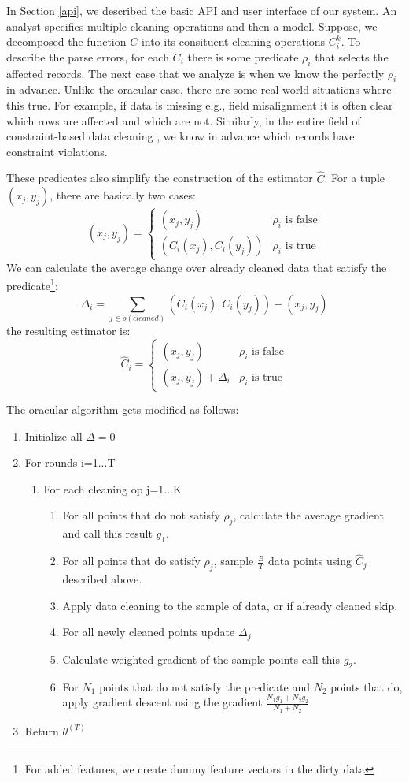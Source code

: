In Section \ref{api}, we described the basic API and user interface of our system.
An analyst specifies multiple cleaning operations and then a model.
Suppose, we decomposed the function $C$ into its consituent cleaning operations ${C}_i^{k}$.
To describe the parse errors, for each $C_i$ there is some predicate $\rho_i$ that selects the affected records.
The next case that we analyze is when we know the perfectly $\rho_i$ in advance.
Unlike the oracular case, there are some real-world situations where this true.
For example, if data is missing e.g., field misalignment it is often clear which rows are affected and which are not.
Similarly, in the entire field of constraint-based data cleaning \cite{nadeef}, we know in advance which records have constraint violations.

These predicates also simplify the construction of the estimator $\hat{C}$. 
For a tuple $(x_j,y_j)$, there are basically two cases:
\[
(x_j,y_j)= \begin{cases} (x_j,y_j) &\rho_i \text{ is false} \\ 
(C_i(x_j),C_i(y_j)) & \rho_i \text{ is true} 
\end{cases} 
\]
We can calculate the average change over already cleaned data that satisfy the predicate\footnote{For added features, we create dummy feature vectors in the dirty data}:
\[
\Delta_i = \sum_{j \in \rho(cleaned)} (C_i(x_j),C_i(y_j)) - (x_j,y_j)
\]
the resulting estimator is:
\[
\hat{C}_i= \begin{cases} (x_j,y_j) &\rho_i \text{ is false} \\ 
(x_j,y_j) + \Delta_i & \rho_i \text{ is true} 
\end{cases} 
\]

The oracular algorithm gets modified as follows:
\begin{enumerate}[noitemsep]
\item Initialize all $\Delta = 0$
\item For rounds i=1...T
\begin{enumerate}
	\item For each cleaning op j=1...K
	\begin{enumerate}
		\item For all points that do not satisfy $\rho_j$, calculate the average gradient and call this result $g_1$.
		\item For all points that do satisfy $\rho_j$, sample $\frac{B}{T}$ data points using $\hat{C}_j$ described above.
		\item Apply data cleaning to the sample of data, or if already cleaned skip.
		\item For all newly cleaned points update $\Delta_j$
		\item Calculate weighted gradient of the sample points call this $g_2$.
		\item For $N_1$ points that do not satisfy the predicate and $N_2$ points that do,  apply gradient descent using the gradient $\frac{N_1g_1 + N_2g_2}{N_1 + N_2}$.
	\end{enumerate}
\end{enumerate}
\item Return $\theta^{(T)}$
\end{enumerate} 


